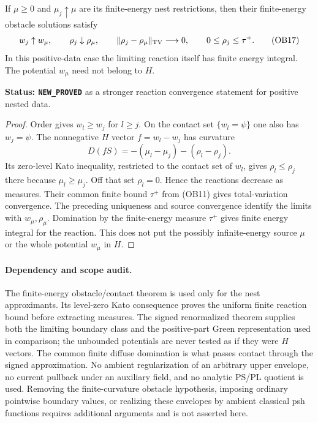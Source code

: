 \begin{corollary}
\label{cor:r11-positive-obstacle-reaction-TV}
If $\mu\ge0$ and $\mu_j\uparrow\mu$ are its finite-energy nest
restrictions, then their finite-energy obstacle solutions satisfy
\[
       w_j\uparrow w_\mu,\qquad
       \rho_j\downarrow\rho_\mu,\qquad
       \|\rho_j-\rho_\mu\|_{\rm TV}\longrightarrow0,\qquad
       0\le\rho_j\le\tau^+.
 \tag{OB17}
\]
In this positive-data case the limiting reaction itself has finite
energy integral.  The potential $w_\mu$ need not belong to $H$.
\end{corollary}

\noindent\textbf{Status: \texttt{NEW\_PROVED}} as a stronger
reaction convergence statement for positive nested data.

\begin{proof}
Order gives $w_l\ge w_j$ for $l\ge j$.  On the contact set
$\{w_l=\psi\}$ one also has $w_j=\psi$.
The nonnegative $H$ vector $f=w_l-w_j$ has curvature
\[
                         D(fS)=-(\mu_l-\mu_j)-(\rho_l-\rho_j).
\]
Its zero-level Kato inequality, restricted to the contact set of
$w_l$, gives $\rho_l\le\rho_j$ there because $\mu_l\ge\mu_j$.
Off that set $\rho_l=0$.  Hence the reactions decrease as measures.
Their common finite bound $\tau^+$ from (OB11) gives total-variation
convergence.  The preceding uniqueness and source convergence identify
the limits with $w_\mu,\rho_\mu$.  Domination by the finite-energy
measure $\tau^+$ gives finite energy integral for the reaction.
This does not put the possibly infinite-energy source $\mu$ or the
whole potential $w_\mu$ in $H$.
\end{proof}

\paragraph{Dependency and scope audit.}
The finite-energy obstacle/contact theorem is used only for the nest
approximants.  Its level-zero Kato consequence proves the uniform
finite reaction bound before extracting measures.  The signed
renormalized theorem supplies both the limiting boundary class and
the positive-part Green representation used in comparison; the
unbounded potentials are never tested as if they were $H$ vectors.
The common finite diffuse domination is what passes contact through
the signed approximation.  No ambient regularization of an arbitrary
upper envelope, no current pullback under an auxiliary field, and no
analytic PS/PL quotient is used.  Removing the finite-curvature
obstacle hypothesis, imposing ordinary pointwise boundary values, or
realizing these envelopes by ambient classical psh functions requires
additional arguments and is not asserted here.
